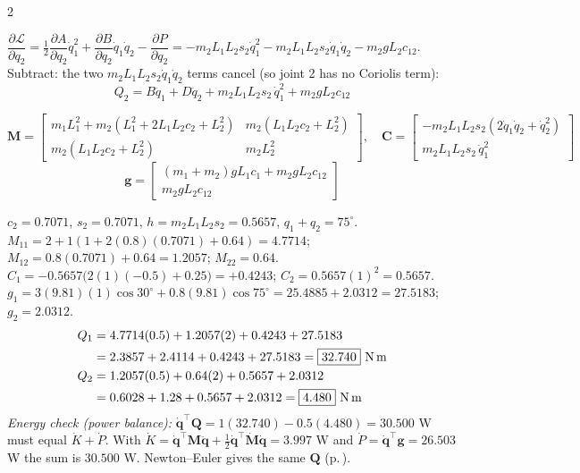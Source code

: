 \begin{multicols}{2}
\begin{deriv}
$\dfrac{\partial\mathcal L}{\partial q_2}=\tfrac12\dfrac{\partial A}{\partial q_2}\dot q_1^2+\dfrac{\partial B}{\partial q_2}\dot q_1\dot q_2-\dfrac{\partial P}{\partial q_2}=-m_2L_1L_2s_2\dot q_1^2-m_2L_1L_2s_2\dot q_1\dot q_2-m_2gL_2c_{12}$.\\
Subtract: the two $m_2L_1L_2s_2\dot q_1\dot q_2$ terms cancel (so joint 2 has no Coriolis term):
\[Q_2=B\ddot q_1+D\ddot q_2+m_2L_1L_2s_2\,\dot q_1^2+m_2gL_2c_{12}\]
\end{deriv}
\begin{fbx}[Result: $\mathbf Q=\mathbf M\ddot{\mathbf q}+\mathbf C+\mathbf g$ \pg{24--25}]
\[\mathbf M=\begin{bmatrix}m_1L_1^2+m_2(L_1^2+2L_1L_2c_2+L_2^2)&m_2(L_1L_2c_2+L_2^2)\\m_2(L_1L_2c_2+L_2^2)&m_2L_2^2\end{bmatrix},\quad
\mathbf C=\begin{bmatrix}-m_2L_1L_2s_2(2\dot q_1\dot q_2+\dot q_2^2)\\m_2L_1L_2s_2\,\dot q_1^2\end{bmatrix}\]
\[\mathbf g=\begin{bmatrix}(m_1+m_2)gL_1c_1+m_2gL_2c_{12}\\m_2gL_2c_{12}\end{bmatrix}\]
\end{fbx}
\begin{worked}[numbers: $m=(2,1)$ kg, $L=(1.0,0.8)$ m, $q=(30^\circ,45^\circ)$, $\dot q=(1,-0.5)$ rad/s, $\ddot q=(0.5,2)$ rad/s$^2$]
$c_2=0.7071$, $s_2=0.7071$, $h=m_2L_1L_2s_2=0.5657$, $q_1+q_2=75^\circ$.\\
$M_{11}=2+1(1+2(0.8)(0.7071)+0.64)=4.7714$; $M_{12}=0.8(0.7071)+0.64=1.2057$; $M_{22}=0.64$.\\
$C_1=-0.5657\big(2(1)(-0.5)+0.25\big)=+0.4243$; $C_2=0.5657(1)^2=0.5657$.\\
$g_1=3(9.81)(1)\cos30^\circ+0.8(9.81)\cos75^\circ=25.4885+2.0312=27.5183$; $g_2=2.0312$.
\begin{align*}Q_1&=4.7714(0.5)+1.2057(2)+0.4243+27.5183\\&=2.3857+2.4114+0.4243+27.5183=\boxed{32.740}\ \text{N\,m}\\
Q_2&=1.2057(0.5)+0.64(2)+0.5657+2.0312\\&=0.6028+1.28+0.5657+2.0312=\boxed{4.480}\ \text{N\,m}\end{align*}
\emph{Energy check (power balance):} $\dot{\mathbf q}^\top\mathbf Q=1(32.740)-0.5(4.480)=30.500$ W must equal $\dot K+\dot P$. With $\dot K=\dot{\mathbf q}^\top\mathbf M\ddot{\mathbf q}+\tfrac12\dot{\mathbf q}^\top\dot{\mathbf M}\dot{\mathbf q}=3.997$ W and $\dot P=\dot{\mathbf q}^\top\mathbf g=26.503$ W the sum is $30.500$ W. \chk Newton--Euler gives the same $\mathbf Q$ (p.\,\pageref{w7:nepass}). \chk

\end{worked}
\end{multicols}
